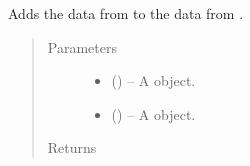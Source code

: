 \documentclass[letterpaper,10pt,openany,oneside,english]{sphinxmanual}
\begin{document}
\begin{fulllineitems}
\label{\detokenize{additional_functions:fredpy.plus}}
Adds the data from  to the data from .
\begin{quote}\begin{description}
\item[{Parameters}] \leavevmode\begin{itemize}
\item {} 
 ({\hyperref[\detokenize{series_class:fredpy.series}]{}}) -- A {\hyperref[\detokenize{series_class:fredpy.series}]{}} object.

\item {} 
 ({\hyperref[\detokenize{series_class:fredpy.series}]{}}) -- A {\hyperref[\detokenize{series_class:fredpy.series}]{}} object.

\end{itemize}

\item[{Returns}] \leavevmode
{\hyperref[\detokenize{series_class:fredpy.series}]{}}

\end{description}\end{quote}

\end{fulllineitems}

\end{document}
